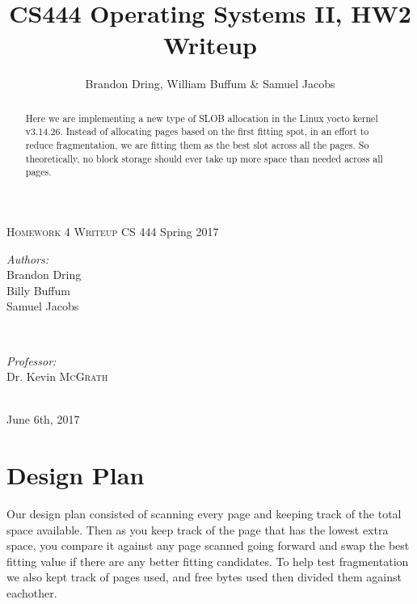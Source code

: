 \documentclass{article}
\title{CS444 Operating Systems II, HW2 Writeup}
\author{Brandon Dring, William Buffum \& Samuel Jacobs}
\begin{document}
\begin{titlepage}

\center

\textsc{\LARGE \hspace{15mm} Homework 4 Writeup} \newline \newline
{\large CS 444 Spring 2017}



\begin{minipage}{0.4\textwidth}
   \begin{flushleft} \large
      \emph{Authors:}\\
      Brandon Dring \\
      Billy Buffum \\
      Samuel Jacobs
   \end{flushleft}
\end{minipage}
~
\begin{minipage}{0.4\textwidth}
   \begin{flushright} \large
      \emph{Professor:} \\
      Dr. Kevin \textsc{McGrath} %
   \end{flushright}
\end{minipage} \\ [4cm]

{\large June 6th, 2017}
\vfill %

\begin{abstract}
    Here we are implementing a new type of SLOB allocation in the Linux yocto kernel v3.14.26. Instead of allocating pages based on the first fitting spot, in an effort to reduce fragmentation, we are fitting them as the best slot across all the pages. So theoretically, no block storage should ever take up more space than needed across all pages.
\end{abstract}

\pagebreak

\end{titlepage}
\newpage

\section{Design Plan}
    Our design plan consisted of scanning every page and keeping track of the total space available. Then as you keep track of the page that has the lowest extra space, you compare it against any page scanned going forward and swap the best fitting value if there are any better fitting candidates. To help test fragmentation we also kept track of pages used, and free bytes used then divided them against eachother.
\end{document}
